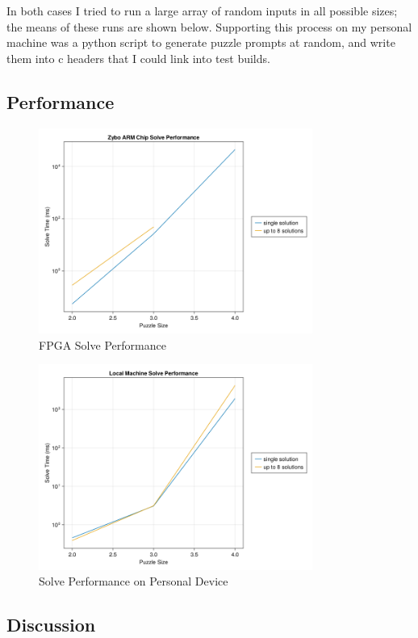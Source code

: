 \documentclass[11pt]{article}
\begin{document}
In both cases I tried to run a large array of random inputs in all possible sizes; the means of these runs are shown below.
Supporting this process on my personal machine was a python script to generate puzzle prompts at random, and write them into c headers that I could link into test builds.



\subsection{Performance}\label{sec:performance}

\begin{figure}[h]
  \centering
  \includegraphics[width=0.8\textwidth]{fpga_perf}
  \caption{FPGA Solve Performance}
\end{figure}

\begin{figure}[h]
  \centering
  \includegraphics[width=0.8\textwidth]{host_perf}
  \caption{Solve Performance on Personal Device}
\end{figure}


\subsection{Discussion}

\end{document}
